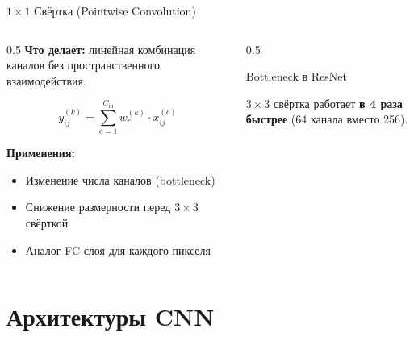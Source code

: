 \documentclass[aspectratio=169, 9pt]{beamer}
\begin{document}
\begin{frame}{$1\times1$ Свёртка (Pointwise Convolution)}
  \begin{columns}[T]
    \begin{column}{0.5\textwidth}
      \textbf{Что делает:} линейная комбинация каналов без пространственного взаимодействия.
      
      \[
      y_{ij}^{(k)} = \sum_{c=1}^{C_{\text{in}}} w_{c}^{(k)} \cdot x_{ij}^{(c)}
      \]
      
      \textbf{Применения:}
      \begin{itemize}
        \item Изменение числа каналов (bottleneck)
        \item Снижение размерности перед $3\times3$ свёрткой
        \item Аналог FC-слоя для каждого пикселя
      \end{itemize}
    \end{column}
    \begin{column}{0.5\textwidth}
      \begin{block}{Bottleneck в ResNet}
        \centering
        
        \vspace{0.3em}
        $3\times3$ свёртка работает \textbf{в 4 раза быстрее} (64 канала вместо 256).
      \end{block}
    \end{column}
  \end{columns}
\end{frame}

\section{Архитектуры CNN}
\end{document}
